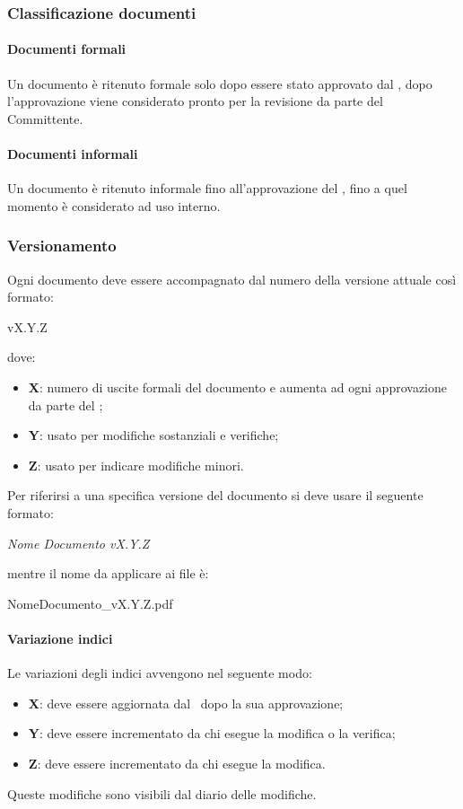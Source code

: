 \documentclass[../NormeDiProgetto.tex]{subfiles}
\begin{document}
			\subsubsection{Classificazione documenti}
				\paragraph{Documenti formali\\}
					Un documento è ritenuto formale solo dopo essere stato approvato dal
					\responsabilediprogetto, dopo l'approvazione viene considerato pronto per la
					revisione da parte del Committente.
				\paragraph{Documenti informali\\}
					Un documento è ritenuto informale fino all'approvazione del
					\responsabilediprogetto, fino a quel momento è considerato ad uso interno.
			\subsubsection{Versionamento}
				Ogni documento deve essere accompagnato dal numero della versione attuale così
				formato:
				\begin{center}
					vX.Y.Z
				\end{center}
				dove:
				\begin{itemize}
					\item \textbf{X}: numero di uscite formali del documento e aumenta ad ogni
					approvazione da parte del \responsabilediprogetto;
					\item \textbf{Y}: usato per modifiche sostanziali e verifiche;
					\item \textbf{Z}: usato per indicare modifiche minori. 
				\end{itemize}
				Per riferirsi a una specifica versione del documento si deve usare il seguente
				formato:
				\begin{center}
					\textit{Nome Documento vX.Y.Z}
				\end{center}
				mentre il nome da applicare ai file è:
				\begin{center}
					NomeDocumento\_vX.Y.Z.pdf
				\end{center}
				\paragraph{Variazione indici\\}
					Le variazioni degli indici avvengono nel seguente modo:
					\begin{itemize}
						\item \textbf{X}: deve essere aggiornata dal \responsabilediprogetto\ dopo
						la sua approvazione;
						\item \textbf{Y}: deve essere incrementato da chi esegue la modifica o la
						verifica;
						\item \textbf{Z}: deve essere incrementato da chi esegue la modifica.
					\end{itemize}
					Queste modifiche sono visibili dal diario delle modifiche.
\end{document}
